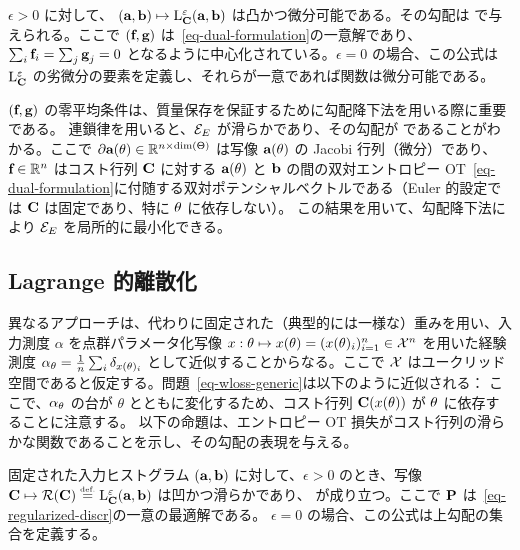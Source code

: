 \begin{proposition}[ヒストグラムに関する微分]
$\epsilon>0$ に対して、
$(\a,\b) \mapsto \MKD_\C^\epsilon(\a,\b)$ は凸かつ微分可能である。その勾配は
\eql{\label{eq-diff-marginals}
		\nabla \MKD_\C^\epsilon(\a,\b) = (\fD,\gD),
}
で与えられる。ここで $(\fD,\gD)$ は~\eqref{eq-dual-formulation}の一意解であり、$\sum_i \fD_i=\sum_j \gD_j=0$ となるように中心化されている。$\epsilon=0$ の場合、この公式は $\MKD_\C^\epsilon$ の劣微分の要素を定義し、それらが一意であれば関数は微分可能である。
\end{proposition}

$(\fD,\gD)$ の零平均条件は、質量保存を保証するために勾配降下法を用いる際に重要である。
連鎖律を用いると、$\Ee_E$ が滑らかであり、その勾配が
であることがわかる。ここで $\partial \a(\th) \in \RR^{n \times \text{dim}(\Theta)}$ は写像 $\a(\th)$ の Jacobi 行列（微分）であり、$\fD \in \RR^n$ はコスト行列 $\C$ に対する $\a(\th)$ と $\b$ の間の双対エントロピー OT~\eqref{eq-dual-formulation}に付随する双対ポテンシャルベクトルである（Euler 的設定では $\C$ は固定であり、特に $\th$ に依存しない）。
この結果を用いて、勾配降下法により $\Ee_E$ を局所的に最小化できる。

\subsection{Lagrange 的離散化}

異なるアプローチは、代わりに固定された（典型的には一様な）重みを用い、入力測度 $\alpha$ を点群パラメータ化写像 $x : \th \mapsto x(\th) = (x(\th)_i)_{i=1}^n \in \Xx^n$ を用いた経験測度 $\al_\th = \frac{1}{n}\sum_i \de_{x(\th)_i}$ として近似することからなる。ここで $\X$ はユークリッド空間であると仮定する。問題~\eqref{eq-wloss-generic}は以下のように近似される：
ここで、$\al_\th$ の台が $\theta$ とともに変化するため、コスト行列 $\C(x(\th))$ が $\th$ に依存することに注意する。
以下の命題は、エントロピー OT 損失がコスト行列の滑らかな関数であることを示し、その勾配の表現を与える。

\begin{proposition}[コストに関する微分]
固定された入力ヒストグラム $(\a,\b)$ に対して、$\epsilon>0$ のとき、写像 $\C \mapsto \Rr(\C) \eqdef \MKD_\C^\epsilon(\a,\b)$ は凹かつ滑らかであり、
\eql{\label{eq-diff-cost}
	\nabla \Rr(\C) = \P,
}
が成り立つ。ここで $\P$ は~\eqref{eq-regularized-discr}の一意の最適解である。
$\epsilon=0$ の場合、この公式は上勾配の集合を定義する。
\end{proposition}


